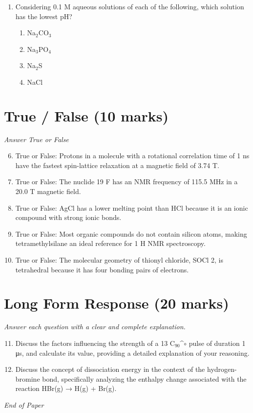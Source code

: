 \documentclass[12pt]{article}
\begin{document}
\begin{enumerate}[label=\arabic*.]
\begin{enumerate}[label=(\alph*)]
    \item I only
    \item II only
    \item III only
    \item I and III only
\end{enumerate}
\item Considering 0.1 M aqueous solutions of each of the following, which solution has the lowest pH?
\begin{enumerate}[label=(\alph*)]
    \item Na$_{2}$CO$_{3}$
    \item Na$_{3}$PO$_{4}$
    \item Na$_{2}$S
    \item NaCl
\end{enumerate}
\end{enumerate}

\section*{True / False (10 marks)}
\textit{Answer True or False}
\begin{enumerate}[label=\arabic*.]
\setcounter{enumi}{5}
\item True or False: Protons in a molecule with a rotational correlation time of 1 ns have the fastest spin-lattice relaxation at a magnetic field of 3.74 T.
\item True or False: The nuclide 19 F has an NMR frequency of 115.5 MHz in a 20.0 T magnetic field.
\item True or False: AgCl has a lower melting point than HCl because it is an ionic compound with strong ionic bonds.
\item True or False: Most organic compounds do not contain silicon atoms, making tetramethylsilane an ideal reference for 1 H NMR spectroscopy.
\item True or False: The molecular geometry of thionyl chloride, SOCl 2, is tetrahedral because it has four bonding pairs of electrons.
\end{enumerate}

\section*{Long Form Response (20 marks)}
\textit{Answer each question with a clear and complete explanation.}
\begin{enumerate}[label=\arabic*.]
\setcounter{enumi}{10}
\item Discuss the factors influencing the strength of a 13 C$_{90}$^\ensuremath{\circ} pulse of duration 1 μs, and calculate its value, providing a detailed explanation of your reasoning.
\item Discuss the concept of dissociation energy in the context of the hydrogen-bromine bond, specifically analyzing the enthalpy change associated with the reaction HBr(g) → H(g) + Br(g).
\end{enumerate}

\vfill
\noindent\textit{End of Paper}
\end{document}
